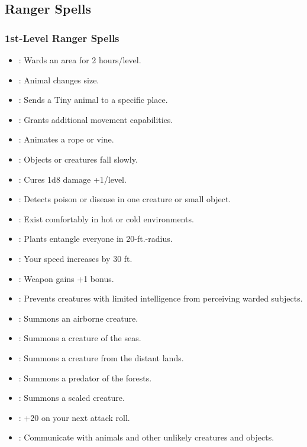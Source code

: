 \subsection{Ranger Spells}
\subsubsection{1st-Level Ranger Spells}
\begin{itemize}
\item {}: Wards an area for 2 hours/level.
\item {}: Animal changes size.
\item {}: Sends a Tiny animal to a specific place.
\item {}: Grants additional movement capabilities.
\item {}: Animates a rope or vine.
\item {}: Objects or creatures fall slowly.
\item {}: Cures 1d8 damage +1/level.
\item {}: Detects poison or disease in one creature or small object.
\item {}: Exist comfortably in hot or cold environments.
\item {}: Plants entangle everyone in 20-ft.-radius.
\item {}: Your speed increases by 30 ft.
\item {}: Weapon gains +1 bonus.
\item {}: Prevents creatures with limited intelligence from perceiving warded subjects.
\item {}: Summons an airborne creature.
\item {}: Summons a creature of the seas.
\item {}: Summons a creature from the distant lands.
\item {}: Summons a predator of the forests.
\item {}: Summons a scaled creature.
\item {}: +20 on your next attack roll.
\item {}: Communicate with animals and other unlikely creatures and objects.
\end{itemize}
